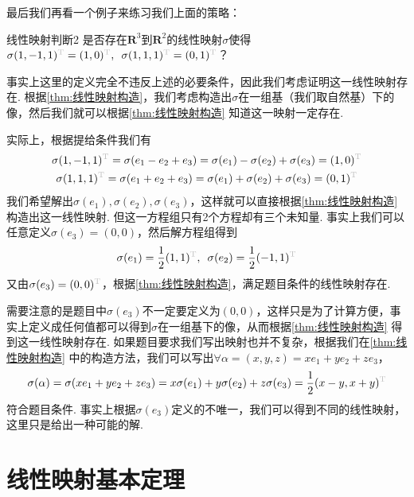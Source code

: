 最后我们再看一个例子来练习我们上面的策略：
\begin{example}{}{线性映射判断2}
    是否存在$\mathbf{R}^3$到$\mathbf{R}^2$的线性映射$\sigma$使得$\sigma(1,-1,1)^{\color{lightgray}\mathrm{T}}=(1,0)^{\color{lightgray}\mathrm{T}},\enspace\sigma(1,1,1)^{\color{lightgray}\mathrm{T}}=(0,1)^{\color{lightgray}\mathrm{T}}$？
\end{example}

\begin{solution}
    事实上这里的定义完全不违反上述的必要条件，因此我们考虑证明这一线性映射存在. 根据\autoref{thm:线性映射构造}，我们考虑构造出$\sigma$在一组基（我们取自然基）下的像，然后我们就可以根据\autoref*{thm:线性映射构造} 知道这一映射一定存在.

    实际上，根据提给条件我们有
    \begin{gather*}
        \sigma(1,-1,1)^{\color{lightgray}\mathrm{T}}
        =\sigma(e_1-e_2+e_3)
        =\sigma(e_1)-\sigma(e_2)+\sigma(e_3)
        =(1,0)^{\color{lightgray}\mathrm{T}} \\
        \sigma(1,1,1)^{\color{lightgray}\mathrm{T}}
        =\sigma(e_1+e_2+e_3)
        =\sigma(e_1)+\sigma(e_2)+\sigma(e_3)
        =(0,1)^{\color{lightgray}\mathrm{T}}
    \end{gather*}
    我们希望解出$\sigma(e_1),\sigma(e_2),\sigma(e_3)$，这样就可以直接根据\autoref*{thm:线性映射构造} 构造出这一线性映射. 但这一方程组只有2个方程却有三个未知量. 事实上我们可以任意定义$\sigma(e_3)=(0,0)$，然后解方程组得到
    \[\sigma(e_1)=\dfrac{1}{2} (1,1)^{\color{lightgray}\mathrm{T}},\enspace \sigma(e_2)=\dfrac{1}{2} (-1,1)^{\color{lightgray}\mathrm{T}}\]
    又由$\sigma(e_3)=(0,0)^{\color{lightgray}\mathrm{T}}$，根据\autoref*{thm:线性映射构造}，满足题目条件的线性映射存在.
\end{solution}
需要注意的是题目中$\sigma(e_3)$不一定要定义为$(0,0)$，这样只是为了计算方便，事实上定义成任何值都可以得到$\sigma$在一组基下的像，从而根据\autoref*{thm:线性映射构造} 得到这一线性映射存在. 如果题目要求我们写出映射也并不复杂，根据我们在\autoref*{thm:线性映射构造} 中的构造方法，我们可以写出$\forall\alpha=(x,y,z)=xe_1+ye_2+ze_3$，
\[
    \sigma(\alpha)
    =\sigma(xe_1+ye_2+ze_3)
    =x\sigma(e_1)+y\sigma(e_2)+z\sigma(e_3)
    =\dfrac{1}{2} (x-y,x+y)^{\color{lightgray}\mathrm{T}}
\]
符合题目条件. 事实上根据$\sigma(e_3)$定义的不唯一，我们可以得到不同的线性映射，这里只是给出一种可能的解.

\section{线性映射基本定理}

